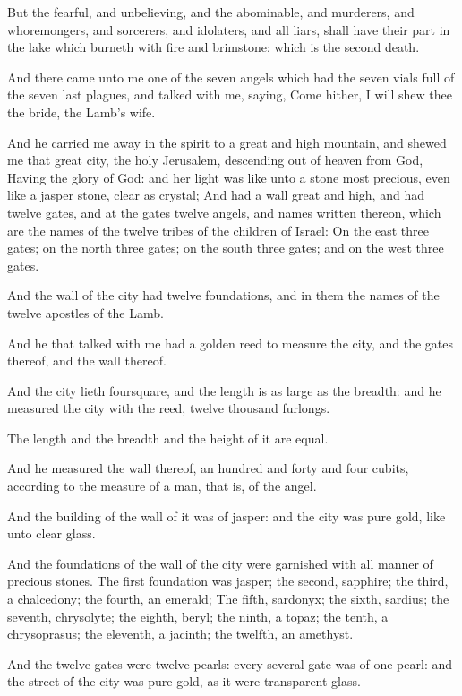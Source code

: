 \Verse But the fearful, and unbelieving, and the abominable, and murderers, and whoremongers, and sorcerers, and idolaters, and all liars, shall have their part in the lake which burneth with fire and brimstone: which is the second death.

\Verse And there came unto me one of the seven angels which had the seven vials full of the seven last plagues, and talked with me, saying, Come hither, I will shew thee the bride, the Lamb's wife.

\Verse And he carried me away in the spirit to a great and high mountain, and shewed me that great city, the holy Jerusalem, descending out of heaven from God, \Verse Having the glory of God: and her light was like unto a stone most precious, even like a jasper stone, clear as crystal; \Verse And had a wall great and high, and had twelve gates, and at the gates twelve angels, and names written thereon, which are the names of the twelve tribes of the children of Israel: \Verse On the east three gates; on the north three gates; on the south three gates; and on the west three gates.

\Verse And the wall of the city had twelve foundations, and in them the names of the twelve apostles of the Lamb.

\Verse And he that talked with me had a golden reed to measure the city, and the gates thereof, and the wall thereof.

\Verse And the city lieth foursquare, and the length is as large as the breadth: and he measured the city with the reed, twelve thousand furlongs.

The length and the breadth and the height of it are equal.

\Verse And he measured the wall thereof, an hundred and forty and four cubits, according to the measure of a man, that is, of the angel.

\Verse And the building of the wall of it was of jasper: and the city was pure gold, like unto clear glass.

\Verse And the foundations of the wall of the city were garnished with all manner of precious stones. The first foundation was jasper; the second, sapphire; the third, a chalcedony; the fourth, an emerald; \Verse The fifth, sardonyx; the sixth, sardius; the seventh, chrysolyte; the eighth, beryl; the ninth, a topaz; the tenth, a chrysoprasus; the eleventh, a jacinth; the twelfth, an amethyst.

\Verse And the twelve gates were twelve pearls: every several gate was of one pearl: and the street of the city was pure gold, as it were transparent glass.

